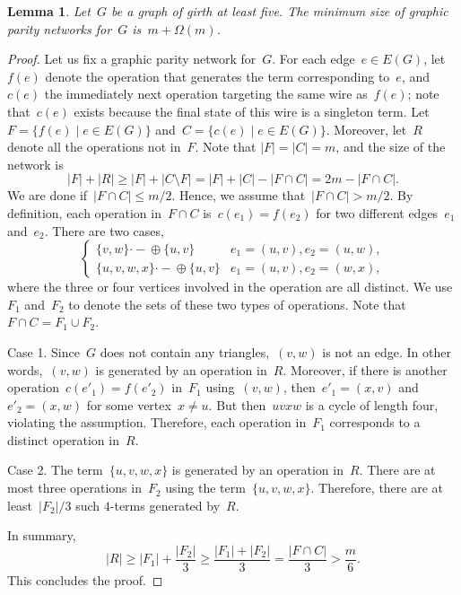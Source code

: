 \documentclass[a4paper,cleveref, autoref, 11pt, fleqn, thm-restate]{article}
\theoremstyle{plain}
\newtheorem{lemma}[theorem]{Lemma}
\renewcommand{\ket}[1]{\{#1\}}
\begin{document}
\begin{lemma}\label{lem:upper-bound}
  Let~$G$ be a graph of girth at least five.  The minimum size of graphic parity networks for~$G$ is~$m + \Omega(m)$.
\end{lemma}
\begin{proof}
  Let us fix a graphic parity network for~$G$.
  For each edge~$e\in E(G)$, let~$f(e)$ denote the operation that generates the term corresponding to~$e$, and~$c(e)$ the immediately next operation targeting the same wire as~$f(e)$; note that~$c(e)$ exists because the final state of this wire is a singleton term.  Let~$F = \{f(e)\mid e\in E(G)\}$ and~$C = \{c(e)\mid e\in E(G)\}$.  Moreover, let~$R$ denote all the operations not in~$F$.
  Note that $|F| = |C| = m$, and the size of the network is
  \[
    |F| + |R| \ge |F| + |C\setminus F| = |F| + |C| - |F \cap C| =2 m -|F\cap C|.
  \]
  We are done if~$|F\cap C| \le m/2$.  Hence, we assume that~$|F\cap C| > m/2$.  By definition, each operation in~$F\cap C$ is~$c(e_{1}) = f(e_{2})$ for two different edges~$e_{1}$ and~$e_{2}$.
  There are two cases,
  \[
    \begin{cases}
      \ket{v, w} \boldsymbol{\cdot}\!\!-\!\!\oplus \ket{u, v}       & e_{1} = (u, v), e_{2} = (u, w),
      \\
      \ket{u, v, w, x} \boldsymbol{\cdot}\!\!-\!\!\oplus \ket{u, v} & e_{1} = (u, v), e_{2} = (w, x),
    \end{cases}
  \]
  where the three or four vertices involved in the operation are all distinct.  We use~$F_{1}$ and~$F_{2}$ to denote the sets of these two types of operations.  Note that~$F\cap C = F_{1}\cup F_{2}$.

  Case 1.  Since~$G$ does not contain any triangles,~$(v, w)$ is not an edge.  In other words,~$(v, w)$ is generated by an operation in~$R$.
  Moreover,
  if there is another operation~$c(e'_{1}) = f(e'_{2})$ in~$F_{1}$ using~$(v, w)$, then~$e'_{1} = (x, v)$ and~$e'_{2} = (x, w)$ for some vertex~$x\ne u$.  But then~$u v x w$ is a cycle of length four, violating the assumption.  Therefore, each operation in~$F_{1}$ corresponds to a distinct operation in~$R$.

  Case 2.  The term~$\ket{u, v, w, x}$ is generated by an operation in~$R$.  There are at most three operations in~$F_{2}$ using the term~$\ket{u, v, w, x}$.  Therefore, there are at least~$|F_{2}|/3$ such $4$-terms generated by~$R$.

  In summary,
  \[
    |R| \ge |F_{1}| + \frac{|F_{2}|}{3} \ge
    \frac{|F_{1}| + |F_{2}|}{3} = \frac{|F\cap C|}{3} > \frac{m}{6}.
  \]
  This concludes the proof.
\end{proof}
\end{document}
